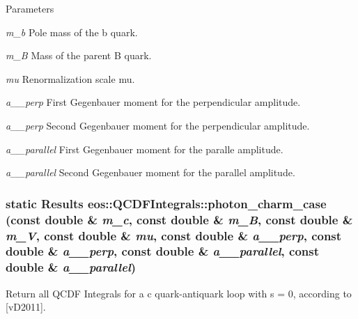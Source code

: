 \begin{DoxyParams}{Parameters}
\item[{\em m\_\-b}]Pole mass of the b quark. \item[{\em m\_\-B}]Mass of the parent B quark. \item[{\em mu}]Renormalization scale mu. \item[{\em a\_\-1\_\-perp}]First Gegenbauer moment for the perpendicular amplitude. \item[{\em a\_\-2\_\-perp}]Second Gegenbauer moment for the perpendicular amplitude. \item[{\em a\_\-1\_\-parallel}]First Gegenbauer moment for the paralle amplitude. \item[{\em a\_\-2\_\-parallel}]Second Gegenbauer moment for the parallel amplitude. \end{DoxyParams}
\hypertarget{classeos_1_1QCDFIntegrals_a9d43810ac4bee250bdd71f4b13a8535a}{
\subsubsection[{photon\_\-charm\_\-case}]{\setlength{\rightskip}{0pt plus 5cm}static {\bf Results} eos::QCDFIntegrals::photon\_\-charm\_\-case (const double \& {\em m\_\-c}, \/  const double \& {\em m\_\-B}, \/  const double \& {\em m\_\-V}, \/  const double \& {\em mu}, \/  const double \& {\em a\_\_\-perp}, \/  const double \& {\em a\_\_\-perp}, \/  const double \& {\em a\_\_\-parallel}, \/  const double \& {\em a\_\_\-parallel})}}
\label{classeos_1_1QCDFIntegrals_a9d43810ac4bee250bdd71f4b13a8535a}
Return all QCDF Integrals for a c quark-\/antiquark loop with s = 0, according to \mbox{[}vD2011\mbox{]}.


